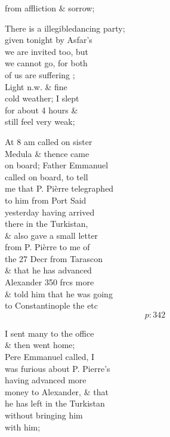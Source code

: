 \documentclass{report}
\begin{document}


	\par{
 	from affliction \& sorrow;\ \\
	}

	\par{
 	There is a \lbrack illegible\rbrack dancing party;\ \\given tonight by Asfar's\ \\we are invited too, but\ \\we cannot go, for both\ \\of us are suffering ;\ \\Light n.w. \& fine\ \\cold weather; I slept\ \\for about 4 hours \&\ \\still feel very weak;\ \\
	}

	\par{
 	At 8 am called on sister\ \\Medula \& thence came\ \\on board; Father Emmanuel\ \\called on board, to tell\ \\me that P. Pièrre telegraphed\ \\to him from Port Said\ \\yesterday having arrived\ \\there in the Turkistan,\ \\\& also gave a small letter\ \\from P. Pièrre to me of\ \\the 27 Decr from Tarascon\ \\\& that he has advanced\ \\Alexander 350 frcs more\ \\\& told him that he was going\ \\to Constantinople the etc\ \\
  \[p: 342 \]

	}

	\par{
 	I sent many to the office\ \\\& then went home;\ \\Pere Emmanuel called, I\ \\was furious about P. Pierre's\ \\having advanced more\ \\money to Alexander, \& that\ \\he has left in the Turkistan\ \\without bringing him\ \\with him;\ \\
	}
\end{document}
